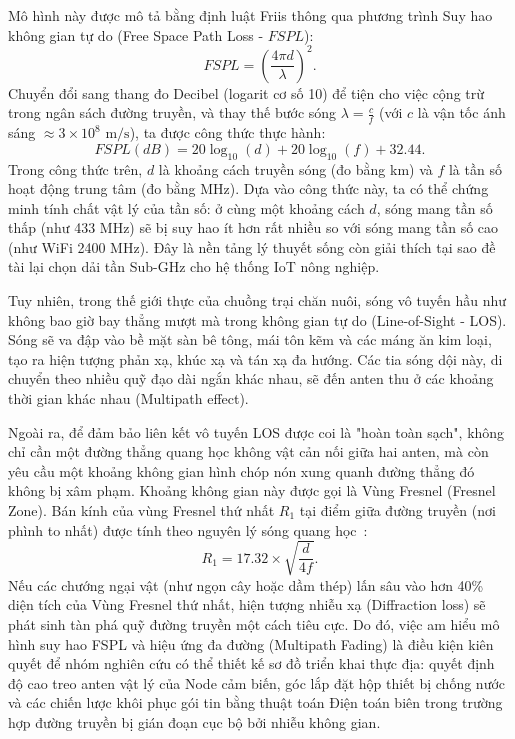 Mô hình này được mô tả bằng định luật Friis thông qua phương trình Suy hao không gian tự do (Free Space Path Loss - $FSPL$)\cite{rappaport2002wireless}:
\begin{equation}
    {FSPL = \left( \frac{4\pi d}{\lambda} \right)^2}.
\end{equation}
Chuyển đổi sang thang đo Decibel (logarit cơ số 10) để tiện cho việc cộng trừ trong ngân sách đường truyền, và thay thế bước sóng $\lambda = \frac{c}{f}$ (với $c$ là vận tốc ánh sáng $\approx 3 \times 10^8 \text{ m/s}$), ta được công thức thực hành:
\begin{equation}
    {FSPL (dB) = 20 \log_{10}(d) + 20 \log_{10}(f) + 32.44}.
\end{equation}
Trong công thức trên, $d$ là khoảng cách truyền sóng (đo bằng km) và $f$ là tần số hoạt động trung tâm (đo bằng MHz). Dựa vào công thức này, ta có thể chứng minh tính chất vật lý của tần số: ở cùng một khoảng cách $d$, sóng mang tần số thấp (như 433 MHz) sẽ bị suy hao ít hơn rất nhiều so với sóng mang tần số cao (như WiFi 2400 MHz). Đây là nền tảng lý thuyết sống còn giải thích tại sao đề tài lại chọn dải tần Sub-GHz cho hệ thống IoT nông nghiệp.

Tuy nhiên, trong thế giới thực của chuồng trại chăn nuôi, sóng vô tuyến hầu như không bao giờ bay thẳng mượt mà trong không gian tự do (Line-of-Sight - LOS). Sóng sẽ va đập vào bề mặt sàn bê tông, mái tôn kẽm và các máng ăn kim loại, tạo ra hiện tượng phản xạ, khúc xạ và tán xạ đa hướng. Các tia sóng dội này, di chuyển theo nhiều quỹ đạo dài ngắn khác nhau, sẽ đến anten thu ở các khoảng thời gian khác nhau (Multipath effect).

Ngoài ra, để đảm bảo liên kết vô tuyến LOS được coi là "hoàn toàn sạch", không chỉ cần một đường thẳng quang học không vật cản nối giữa hai anten, mà còn yêu cầu một khoảng không gian hình chóp nón xung quanh đường thẳng đó không bị xâm phạm. Khoảng không gian này được gọi là Vùng Fresnel (Fresnel Zone). Bán kính của vùng Fresnel thứ nhất $R_1$ tại điểm giữa đường truyền (nơi phình to nhất) được tính theo nguyên lý sóng quang học~\cite{rappaport2002wireless}:
\begin{equation}
    {R_1 = 17.32 \times \sqrt{\frac{d}{4f}}}.
\end{equation}
Nếu các chướng ngại vật (như ngọn cây hoặc dầm thép) lấn sâu vào hơn 40\% diện tích của Vùng Fresnel thứ nhất, hiện tượng nhiễu xạ (Diffraction loss) sẽ phát sinh tàn phá quỹ đường truyền một cách tiêu cực. Do đó, việc am hiểu mô hình suy hao FSPL và hiệu ứng đa đường (Multipath Fading) là điều kiện kiên quyết để nhóm nghiên cứu có thể thiết kế sơ đồ triển khai thực địa: quyết định độ cao treo anten vật lý của Node cảm biến, góc lắp đặt hộp thiết bị chống nước và các chiến lược khôi phục gói tin bằng thuật toán Điện toán biên trong trường hợp đường truyền bị gián đoạn cục bộ bởi nhiễu không gian.


